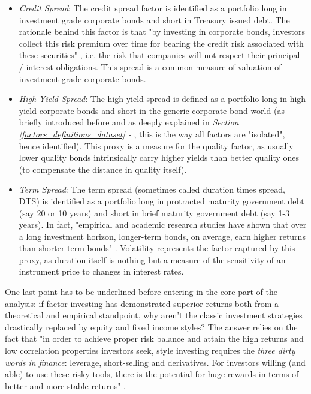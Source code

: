 \documentclass[12pt]{article}
\begin{document}
\begin{itemize}
\item \textit{Credit Spread}: The credit spread factor is identified as a portfolio long in investment grade corporate bonds and short in Treasury issued debt. The rationale behind this factor is that "by investing in corporate bonds, investors collect this risk premium over time for bearing the credit risk associated with these securities" \cite{fixed-income-investing-fidelity}, i.e. the risk that companies will not respect their principal / interest obligations. This spread is a common measure of valuation of investment-grade corporate bonds.

\item \textit{High Yield Spread}: The high yield spread is defined as a portfolio long in high yield corporate bonds and short in the generic corporate bond world (as briefly introduced before and as deeply explained in \textit{Section \ref{factors_definitions_dataset} - }, this is the way all factors are "isolated", hence identified). This proxy is a measure for the quality factor, as usually lower quality bonds intrinsically carry higher yields than better quality ones (to compensate the distance in quality itself).

\item \textit{Term Spread}: The term spread (sometimes called duration times spread, DTS) is identified as a portfolio long in protracted maturity government debt (say 20 or 10 years) and short in brief maturity government debt (say 1-3 years). In fact, "empirical and academic research studies have shown that over a long investment horizon, longer-term bonds, on average, earn higher returns than shorter-term bonds" \cite{fixed-income-investing}. Volatility represents the factor captured by this proxy, as duration itself is nothing but a measure of the sensitivity of an instrument price to changes in interest rates.
\end{itemize}

One last point has to be underlined before entering in the core part of the analysis: if factor investing has demonstrated superior returns both from a theoretical and empirical standpoint, why aren't the classic investment strategies drastically replaced by equity and fixed income styles? The answer relies on the fact that "in order to achieve proper risk balance and attain the high returns and low correlation properties investors seek, style investing requires the \textit{three dirty words in finance}: leverage, short-selling and derivatives. For investors willing (and able) to use these risky tools, there is the potential for huge rewards in terms of better and more stable returns" \cite{asness2015investing}.
\end{document}
